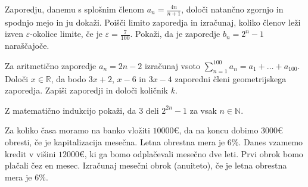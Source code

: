 \documentclass{izpit}
\begin{document}
\naloga[\tocke{8}]
  \podnaloga[4]
  Zaporedju, danemu s splošnim členom $a_n=\frac{4n}{n+1}$, določi natančno zgornjo in spodnjo mejo in ju dokaži.
  \prostor[1]
  \podnaloga[4]
  Poišči limito zaporedja in izračunaj, koliko členov leži izven $\varepsilon$-okolice limite, če je $\varepsilon=\frac{7}{100}$.
  \prostor[1]
  \naloga*[\tocke{3}]
  Pokaži, da je zaporedje $b_n=2^n-1$ naraščajoče.
  \prostor[1]

  
\naloga[\tocke{2}]
  Za aritmetično zaporedje $a_n=2n-2$ izračunaj vsoto $\sum_{n=1}^{100} a_n =a_1 +\ldots +a_{100}$.
  \prostor[1]
  \naloga*[\tocke{5}]
  Določi $x\in\mathbb{R}$, da bodo $3x+2$, $x-6$ in $3x-4$ zaporedni členi geometrijskega zaporedja. Zapiši zaporedji in določi količnik $k$.
  \prostor[3]


\naloga[\tocke{5}]
  Z matematično indukcijo pokaži, da $3$ deli $2^{2n}-1$ za vsak $n\in \mathbb{N}$.


\naloga[\tocke{8}]
  \podnaloga[4]
  Za koliko časa moramo na banko vložiti $10000\euro{}$, da na koncu dobimo $3000\euro{}$ obresti, če je kapitalizacija mesečna. Letna obrestna mera je $6\%$.
  \prostor[1]
  \podnaloga[4]
  Danes vzamemo kredit v višini $12000\euro{}$, ki ga bomo odplačevali mesečno dve leti. Prvi obrok bomo plačali čez en mesec. Izračunaj mesečni obrok (anuiteto), če je letna obrestna mera je $6\%$.
  \prostor[1]
\end{document}
